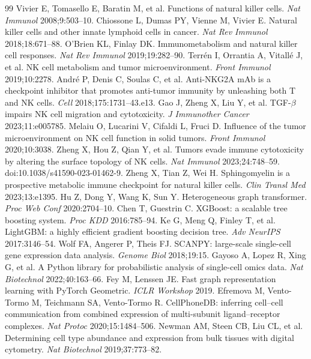 \documentclass[modern,large,numbered,nocrop]{oup-authoring-template}
\begin{document}
\begin{thebibliography}{99}
 Vivier E, Tomasello E, Baratin M, et al. Functions of natural killer cells. \textit{Nat Immunol} 2008;9:503--10.
 Chiossone L, Dumas PY, Vienne M, Vivier E. Natural killer cells and other innate lymphoid cells in cancer. \textit{Nat Rev Immunol} 2018;18:671--88.
 O'Brien KL, Finlay DK. Immunometabolism and natural killer cell responses. \textit{Nat Rev Immunol} 2019;19:282--90.
 Terrén I, Orrantia A, Vitallé J, et al. NK cell metabolism and tumor microenvironment. \textit{Front Immunol} 2019;10:2278.
 André P, Denis C, Soulas C, et al. Anti-NKG2A mAb is a checkpoint inhibitor that promotes anti-tumor immunity by unleashing both T and NK cells. \textit{Cell} 2018;175:1731--43.e13.
 Gao J, Zheng X, Liu Y, et al. TGF-$\beta$ impairs NK cell migration and cytotoxicity. \textit{J Immunother Cancer} 2023;11:e005785.
 Melaiu O, Lucarini V, Cifaldi L, Fruci D. Influence of the tumor microenvironment on NK cell function in solid tumors. \textit{Front Immunol} 2020;10:3038.
 Zheng X, Hou Z, Qian Y, et al. Tumors evade immune cytotoxicity by altering the surface topology of NK cells. \textit{Nat Immunol} 2023;24:748--59. doi:10.1038/s41590-023-01462-9.
 Zheng X, Tian Z, Wei H. Sphingomyelin is a prospective metabolic immune checkpoint for natural killer cells. \textit{Clin Transl Med} 2023;13:e1395.
 Hu Z, Dong Y, Wang K, Sun Y. Heterogeneous graph transformer. \textit{Proc Web Conf} 2020:2704--10.
 Chen T, Guestrin C. XGBoost: a scalable tree boosting system. \textit{Proc KDD} 2016:785--94.
 Ke G, Meng Q, Finley T, et al. LightGBM: a highly efficient gradient boosting decision tree. \textit{Adv NeurIPS} 2017:3146--54.
 Wolf FA, Angerer P, Theis FJ. SCANPY: large-scale single-cell gene expression data analysis. \textit{Genome Biol} 2018;19:15.
 Gayoso A, Lopez R, Xing G, et al. A Python library for probabilistic analysis of single-cell omics data. \textit{Nat Biotechnol} 2022;40:163--66.
 Fey M, Lenssen JE. Fast graph representation learning with PyTorch Geometric. \textit{ICLR Workshop} 2019.
 Efremova M, Vento-Tormo M, Teichmann SA, Vento-Tormo R. CellPhoneDB: inferring cell--cell communication from combined expression of multi-subunit ligand--receptor complexes. \textit{Nat Protoc} 2020;15:1484--506.
 Newman AM, Steen CB, Liu CL, et al. Determining cell type abundance and expression from bulk tissues with digital cytometry. \textit{Nat Biotechnol} 2019;37:773--82.

\end{thebibliography}
\end{document}
